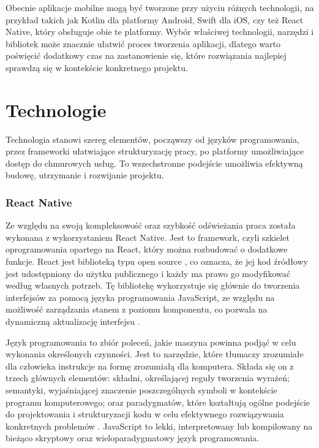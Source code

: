 \phantom{th}
Obecnie aplikacje mobilne mogą być tworzone przy użyciu różnych technologii, na przykład takich jak Kotlin dla platformy Android, Swift dla iOS, czy też React Native, który obsługuje obie te platformy. Wybór właściwej technologii, narzędzi i bibliotek może znacznie ułatwić proces tworzenia aplikacji, dlatego warto poświęcić dodatkowy czas na zastanowienie się, które rozwiązania najlepiej sprawdzą się w kontekście konkretnego projektu.

\section{Technologie}
\phantom{Th}
Technologia stanowi szereg elementów, począwszy od języków programowania, przez frameworki ułatwiające strukturyzację pracy, po platformy umożliwiające dostęp do chmurowych usług. To wszechstronne podejście umożliwia efektywną budowę, utrzymanie i rozwijanie projektu.

\subsubsection*{\textbf{React Native}}
\phantom{th}
Ze względu na swoją kompleksowość oraz szybkość odświeżania praca została wykonana z wykorzystaniem React Native. Jest to framework, czyli szkielet oprogramowania \cite{framework} opartego na React, który można rozbudować o dodatkowe funkcje. React jest biblioteką typu open source \cite{opensource}, co oznacza, że jej kod źródłowy jest udostępniony do użytku publicznego i każdy ma prawo go modyfikować według własnych potrzeb. Tę bibliotekę wykorzystuje się głównie do tworzenia interfejsów za pomocą języka programowania JavaScript, ze względu na możliwość zarządzania stanem z poziomu komponentu, co pozwala na dynamiczną aktualizację interfejsu \cite{javascripteverywhere}.

Język programowania to zbiór poleceń, jakie maszyna powinna podjąć w celu wykonania określonych czynności. Jest to narzędzie, które tłumaczy zrozumiałe dla człowieka instrukcje na formę zrozumiałą dla komputera. Składa się on z trzech głównych elementów: składni, określającej reguły tworzenia wyrażeń; semantyki, wyjaśniającej znaczenie poszczególnych symboli w kontekście programu komputerowego; oraz paradygmatów, które kształtują ogólne podejście do projektowania i strukturyzacji kodu w celu efektywnego rozwiązywania konkretnych problemów \cite{jezykprog}. JavaScript to lekki, interpretowany lub kompilowany na bieżąco skryptowy oraz wieloparadygmatowy język programowania.

